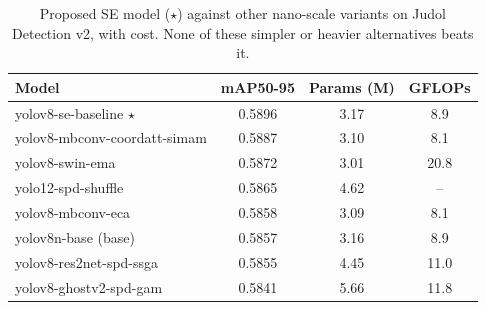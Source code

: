 \begin{table}[t]
\caption{Proposed SE model ($\star$) against other nano-scale variants on Judol Detection v2, with cost. None of these simpler or heavier alternatives beats it.}
\label{tab:broader}
\centering\footnotesize\renewcommand{\arraystretch}{1.2}
\begin{tabular}{@{}lccc@{}}
\toprule
\textbf{Model} & \textbf{mAP50-95} & \textbf{Params (M)} & \textbf{GFLOPs} \\
\midrule
yolov8-se-baseline $\star$ & 0.5896 & 3.17 & 8.9 \\
yolov8-mbconv-coordatt-simam & 0.5887 & 3.10 & 8.1 \\
yolov8-swin-ema & 0.5872 & 3.01 & 20.8 \\
yolo12-spd-shuffle & 0.5865 & 4.62 & -- \\
yolov8-mbconv-eca & 0.5858 & 3.09 & 8.1 \\
yolov8n-base (base) & 0.5857 & 3.16 & 8.9 \\
yolov8-res2net-spd-ssga & 0.5855 & 4.45 & 11.0 \\
yolov8-ghostv2-spd-gam & 0.5841 & 5.66 & 11.8 \\
\bottomrule
\end{tabular}
\end{table}

